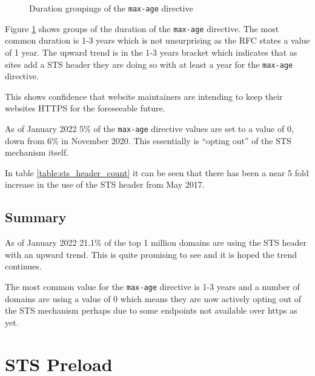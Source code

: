 \documentclass{mscreport}
\begin{document}
\clearpage
\newpage

\begin{figure}[t]
	\begin{center}
		\caption{Duration groupings of the \texttt{max-age} directive}
		\label{fig:STS_max-age}
	\end{center}
\end{figure}

\noindent
Figure \ref{fig:STS_max-age} shows groups of the duration of the \texttt{max-age} directive. The most common duration is 1-3 years which is not unsurprising as the RFC states a value of 1 year. The upward trend is in the 1-3 years bracket which indicates that as sites add a STS header they are doing so with at least a year for the \texttt{max-age} directive.

\vspace{0.3cm} \noindent
This shows confidence that website maintainers are intending to keep their websites HTTPS for the foreseeable future.

\vspace{0.3cm} \noindent
As of January 2022 5\% of the \texttt{max-age} directive values are set to a value of 0, down from 6\% in November 2020. This essentially is ``opting out'' of the STS mechanism itself.

\vspace{0.3cm} \noindent
In table \ref{table:sts_header_count} it can be seen that there has been a near 5 fold increase in the use of the STS header from May 2017.

\subsection{Summary}

\noindent
As of January 2022 21.1\% of the top 1 million domains are using the STS header with an upward trend. This is quite promising to see and it is hoped the trend continues.


\vspace{0.3cm} \noindent
The most common value for the \texttt{max-age} directive is 1-3 years and a number of domains are using a value of 0 which means they are now actively opting out of the STS mechanism perhaps due to some endpoints not available over https as yet.


\clearpage
\newpage

\section{STS Preload}
\label{section:STS_preload}
\end{document}
